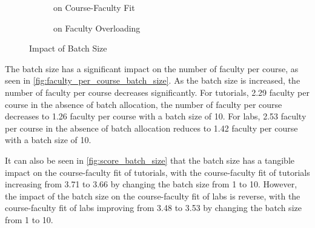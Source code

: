 \begin{figure}[H]
\begin{subfigure}[h]{0.4\linewidth}
    \caption{on Course-Faculty Fit}
    \label{fig:score_batch_size}
  \end{subfigure}
  \par \bigskip
  \begin{subfigure}[h]{\linewidth}
    \centering
    \caption{on Faculty Overloading}
    \label{fig:overloading_batch_size}
  \end{subfigure}
  \caption{Impact of Batch Size}
\end{figure}

The batch size has a significant impact on the number of faculty per course, as seen in \autoref{fig:faculty_per_course_batch_size}. As the batch size is increased, the number of faculty per course decreases significantly. For tutorials, 2.29 faculty per course in the absence of batch allocation, the number of faculty per course decreases to 1.26 faculty per course with a batch size of 10. For labs, 2.53 faculty per course in the absence of batch allocation reduces to 1.42 faculty per course with a batch size of 10.

It can also be seen in \autoref{fig:score_batch_size} that the batch size has a tangible impact on the course-faculty fit of tutorials, with the course-faculty fit of tutorials increasing from 3.71 to 3.66 by changing the batch size from 1 to 10. However, the impact of the batch size on the course-faculty fit of labs is reverse, with the course-faculty fit of labs improving from 3.48 to 3.53 by changing the batch size from 1 to 10.

